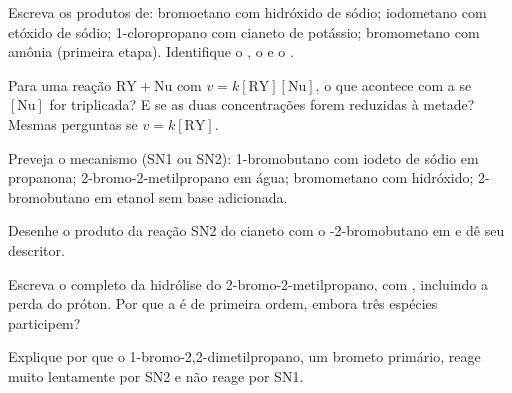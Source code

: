 \begin{exercise}[$\star$]\label{exo:b1:nucleophilic-substitution:1}
Escreva os produtos de: bromoetano com hidróxido de sódio; iodometano
com etóxido de sódio; 1-cloropropano com cianeto de potássio;
bromometano com amônia (primeira etapa). Identifique o , o
 e o .
\end{exercise}

\begin{exercise}[$\star$]\label{exo:b1:nucleophilic-substitution:2}
Para uma reação $\mathrm{RY} + \mathrm{Nu}$ com $v = k[\mathrm{RY}][\mathrm{Nu}]$,
o que acontece com a  se $[\mathrm{Nu}]$ for
triplicada? E se as duas concentrações forem reduzidas à metade? Mesmas
perguntas se $v = k[\mathrm{RY}]$.
\end{exercise}

\begin{exercise}[$\star$]\label{exo:b1:nucleophilic-substitution:3}
Preveja o mecanismo (SN1 ou SN2): 1-bromobutano com iodeto de sódio em
propanona; 2-bromo-2-metilpropano em água; bromometano com hidróxido;
2-bromobutano em etanol sem base adicionada.
\end{exercise}

\begin{exercise}[$\star$]\label{exo:b1:nucleophilic-substitution:4}
Desenhe o produto da reação SN2 do cianeto com o -2-bromobutano
em  e dê seu descritor.
\end{exercise}

\begin{exercise}[$\star\star$]\label{exo:b1:nucleophilic-substitution:5}
Escreva o  completo da hidrólise do
2-bromo-2-metilpropano, com , incluindo a perda do próton.
Por que a  é de primeira ordem, embora três espécies
participem?
\end{exercise}

\begin{exercise}[$\star\star$]\label{exo:b1:nucleophilic-substitution:6}
Explique por que o 1-bromo-2,2-dimetilpropano, um brometo primário,
reage muito lentamente por SN2 e não reage por SN1.
\end{exercise}

